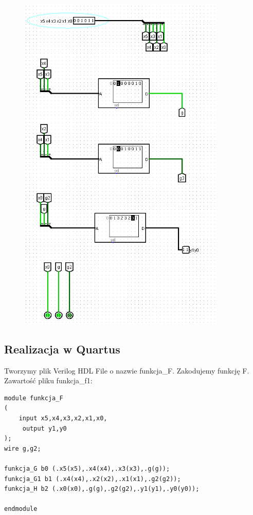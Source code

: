 \documentclass[]{article}
\begin{document}
\begin{figure}[H]
	\centering
	\includegraphics[width=0.88\textwidth]{test3_001011.png}
\end{figure}


\subsection{Realizacja w Quartus}
Tworzymy plik Verilog HDL File o nazwie funkcja\_F. Zakodujemy funkcję F. 
\newline
Zawartość pliku funkcja\_f1:
\begin{lstlisting}[style={prettyverilog}]
module funkcja_F
(   
    input x5,x4,x3,x2,x1,x0,
	 output y1,y0
);	 
wire g,g2;
 
funkcja_G b0 (.x5(x5),.x4(x4),.x3(x3),.g(g));
funkcja_G1 b1 (.x4(x4),.x2(x2),.x1(x1),.g2(g2));
funkcja_H b2 (.x0(x0),.g(g),.g2(g2),.y1(y1),.y0(y0));
 
endmodule
\end{lstlisting}
\end{document}
